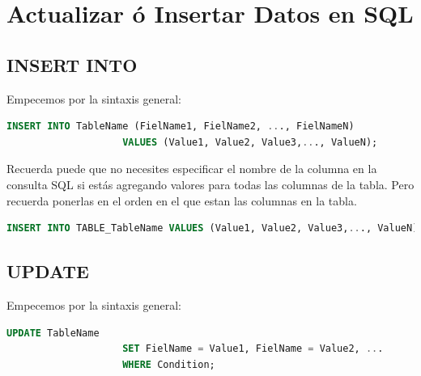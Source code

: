 \documentclass[12pt, fleqn]{report}                             %
\theoremstyle{break}                                            %
\begin{document}
    \clearpage
    \chapter{Actualizar ó Insertar Datos en SQL}


        \clearpage
        \section{INSERT INTO}

            Empecemos por la sintaxis general:

            \begin{lstlisting}[language=SQL, gobble=16]
                INSERT INTO TableName (FielName1, FielName2, ..., FielNameN)  
                    VALUES (Value1, Value2, Value3,..., ValueN);
            \end{lstlisting}

            Recuerda puede que no necesites especificar el nombre de la columna
            en la consulta SQL si estás agregando valores para todas las columnas de la tabla.
            Pero recuerda ponerlas en el orden en el que estan las columnas en la tabla.

            \begin{lstlisting}[language=SQL, gobble=16]
                INSERT INTO TABLE_TableName VALUES (Value1, Value2, Value3,..., ValueN);
            \end{lstlisting}


        \clearpage
        \section{UPDATE}

            Empecemos por la sintaxis general:

            \begin{lstlisting}[language=SQL, gobble=16]
                UPDATE TableName
                    SET FielName = Value1, FielName = Value2, ...
                    WHERE Condition;
            \end{lstlisting}
\end{document}
